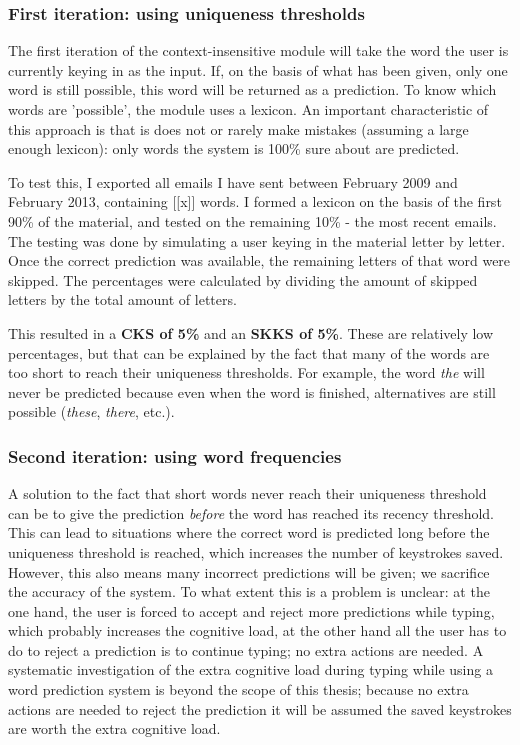 \documentclass[12pt]{article}
\begin{document}
\subsubsection{First iteration: using uniqueness thresholds}

The first iteration of the context-insensitive module will take the word the user is currently keying in as the input. If, on the basis of what has been given, only one word is still possible, this word will be returned as a prediction. To know which words are 'possible', the module uses a lexicon. An important characteristic of this approach is that is does not or rarely make mistakes (assuming a large enough lexicon): only words the system is 100\% sure about are predicted.

To test this, I exported all emails I have sent between February 2009 and February 2013, containing [[x]] words. I formed a lexicon on the basis of the first 90\% of the material, and tested on the remaining 10\% - the most recent emails. The testing was done by simulating a user keying in the material letter by letter. Once the correct prediction was available, the remaining letters of that word were skipped. The percentages were calculated by dividing the amount of skipped letters by the total amount of letters.

This resulted in a \textbf{CKS of 5\%} and an \textbf{SKKS of 5\%}. These are relatively low percentages, but that can be explained by the fact that many of the words are too short to reach their uniqueness thresholds. For example, the word \emph{the} will never be predicted because even when the word is finished, alternatives are still possible (\emph{these}, \emph{there}, etc.).

\subsubsection{Second iteration: using word frequencies}
A solution to the fact that short words never reach their uniqueness threshold can be to give the prediction \emph{before} the word has reached its recency threshold. This can lead to situations where the correct word is predicted long before the uniqueness threshold is reached, which increases the number of keystrokes saved. However, this also means many incorrect predictions will be given; we sacrifice the accuracy of the system. To what extent this is a problem is unclear: at the one hand, the user is forced to accept and reject more predictions while typing, which probably increases the cognitive load, at the other hand all the user has to do to reject a prediction is to continue typing; no extra actions are needed. A systematic investigation of the extra cognitive load during typing while using a word prediction system is beyond the scope of this thesis; because no extra actions are needed to reject the prediction it will be assumed the saved keystrokes are worth the extra cognitive load.
\end{document}
